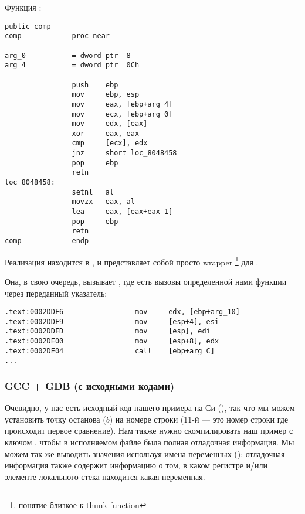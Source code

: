 Функция \comp:

\begin{lstlisting}[style=customasmx86]
                public comp
comp            proc near

arg_0           = dword ptr  8
arg_4           = dword ptr  0Ch

                push    ebp
                mov     ebp, esp
                mov     eax, [ebp+arg_4]
                mov     ecx, [ebp+arg_0]
                mov     edx, [eax]
                xor     eax, eax
                cmp     [ecx], edx
                jnz     short loc_8048458
                pop     ebp
                retn
loc_8048458:
                setnl   al
                movzx   eax, al
                lea     eax, [eax+eax-1]
                pop     ebp
                retn
comp            endp
\end{lstlisting}

Реализация \qsort находится в , и представляет собой просто wrapper
\footnote{понятие близкое к \gls{thunk function}} для .

Она, в свою очередь, вызывает , где есть вызовы определенной нами функции через переданный указатель:


\begin{lstlisting}[caption=(файл libc.so.6{,} версия glibc: 2.10.1),style=customasmx86]
.text:0002DDF6                 mov     edx, [ebp+arg_10]
.text:0002DDF9                 mov     [esp+4], esi
.text:0002DDFD                 mov     [esp], edi
.text:0002DE00                 mov     [esp+8], edx
.text:0002DE04                 call    [ebp+arg_C]
...
\end{lstlisting}

\subsubsection{GCC + GDB (с исходными кодами)}

Очевидно, у нас есть исходный код нашего примера на Си (), 
так что мы можем установить точку останова ($b$) на номере строки
(11-й --- это номер строки где происходит первое сравнение).
Нам также нужно скомпилировать наш пример с ключом , чтобы в исполняемом файле была
полная отладочная информация.
Мы можем так же выводить значения используя имена переменных ():
отладочная информация также содержит информацию о том, в каком регистре и/или элементе локального
стека находится какая переменная.

